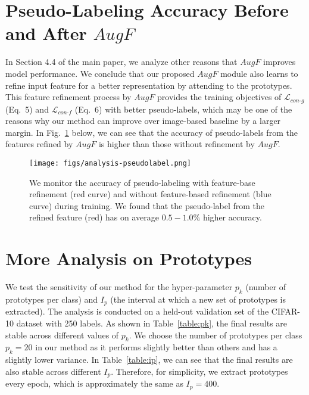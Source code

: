 \documentclass[runningheads]{llncs}
\begin{document}
\section{Pseudo-Labeling Accuracy Before and After $AugF$}
In Section 4.4 of the main paper, we analyze other reasons that $AugF$ improves model performance.
We conclude that our proposed $AugF$ module also learns to refine input feature for a better representation by attending to the prototypes.
This feature refinement process by $AugF$ provides the training objectives of $\mathcal{L}_{con\text{-}g}$ (Eq.~5) and $\mathcal{L}_{con\text{-}f}$ (Eq.~6) with better pseudo-labels, which may be one of the reasons why our method can improve over image-based baseline by a larger margin.
In Fig.~\ref{fig:analysis-pseudolabel} below, we can see that the accuracy of pseudo-labels from the features refined by $AugF$ is higher than those without refinement by $AugF$.

\begin{figure}[h]
\centering
\texttt{[image: figs/analysis-pseudolabel.png]}
\caption{
We monitor the accuracy of pseudo-labeling with feature-base refinement (red curve) and without feature-based refinement (blue curve) during training.
We found that the pseudo-label from the refined feature (red) has on average $0.5-1.0 \%$ higher accuracy.
}
\label{fig:analysis-pseudolabel}
\end{figure}


\section{More Analysis on Prototypes}

We test the sensitivity of our method for the hyper-parameter $p_k$ (number of prototypes per class) and $I_p$ (the interval at which a new set of prototypes is extracted).
The analysis is conducted on a held-out validation set of the CIFAR-10 dataset with 250 labels.
As shown in Table~\ref{table:pk}, the final results are stable across different values of $p_k$.
We choose the number of prototypes per class $p_k = 20$ in our method as it performs slightly better than others and has a slightly lower variance.
In Table~\ref{table:ip}, we can see that the final results are also stable across different $I_p$.
Therefore, for simplicity, we extract prototypes every epoch, which is approximately the same as $I_p=400$.

\begin{table*}[h]
\centering
\renewcommand{\arraystretch}{1.2}
\caption{
Sensitivity analysis for $p_k$.
Numbers represent error rates in three runs.
}
\label{table:pk}
\end{table*}
\end{document}
